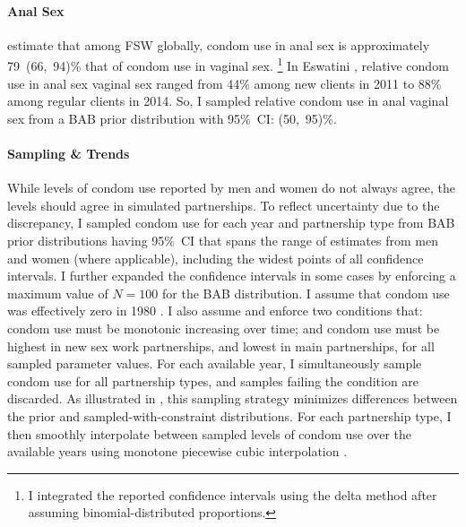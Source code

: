 \paragraph{Anal Sex}
\citet{Owen2020} estimate that among FSW globally,
condom use in anal sex is approximately 79~(66,~94)\% that of condom use in vaginal sex.%
\footnote{I integrated the reported confidence intervals using the delta method
  after assuming binomial-distributed proportions.}
In Eswatini \cite{Baral2014,EswKP2014}, relative condom use in anal sex \vs vaginal sex
ranged from 44\% among new clients in 2011 to 88\% among regular clients in 2014.
So, I sampled relative condom use in anal \vs vaginal sex from a BAB prior distribution
with 95\%~CI: (50,~95)\%.
\paragraph{Sampling \& Trends}
While levels of condom use reported by men and women do not always agree,
the levels should agree in simulated partnerships.
To reflect uncertainty due to the discrepancy,
I sampled condom use for each year and partnership type
from BAB prior distributions having 95\%~CI
that spans the range of estimates from men and women (where applicable),
including the widest points of all confidence intervals.
I further expanded the confidence intervals in some cases
by enforcing a maximum value of $N = 100$ for the BAB distribution.
I assume that condom use was effectively zero in 1980 \cite{SFHS1988}.
I also assume and enforce two conditions that:
condom use must be monotonic increasing over time; and
condom use must be highest in new sex work partnerships, and lowest in main partnerships,
for all sampled parameter values.
For each available year, I simultaneously sample condom use for all partnership types,
and samples failing the condition are discarded.
As illustrated in , this sampling strategy
minimizes differences between the prior and sampled-with-constraint distributions.
For each partnership type, I then smoothly interpolate
between sampled levels of condom use over the available years
using monotone piecewise cubic interpolation \cite{Fritsch1980}.
